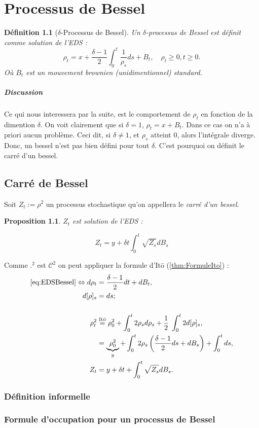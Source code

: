 \documentclass[openany]{book}
\makeatletter
\newcommand{\1}{\mathbbm{1}}
\renewenvironment{proof}[1][\textbf{\textit{Démonstration}}]{%
  \par\pushQED{\qed}%
  \normalfont\itshape\topsep6\p@\@plus6\p@\relax
  \trivlist\item[\hskip\labelsep
    #1\@addpunct{.}]\ignorespaces
}{%
  \popQED\endtrivlist\@endpefalse
}
\theoremstyle{thmfont}
\theoremstyle{deffont}
\newtheorem{definition}[definition]{Définition}
\theoremstyle{thmfont}
\newtheorem{prop}[prop]{Proposition}
\theoremstyle{deffont}
\makeatother
\begin{document}
\chapter{Processus de Bessel}

\begin{definition}[$\delta$-Processus de Bessel]
  Un $\delta$-\textit{processus de Bessel} est définit comme solution de l'EDS :
  \begin{equation}
    \rho_t = x + \dfrac{\delta-1}{2}\int_0^t \dfrac{1}{\rho_s} ds + B_t, \quad \rho_t \geq 0, t \geq 0.
    \label{eq:EDSBessel}
  \end{equation}
      Où $B_t$ est un mouvement brownien (unidimentionnel) standard.
\end{definition}
\paragraph{Discussion} Ce qui nous interessera par la suite, est le comportement de $\rho_t$ en fonction de la dimention $\delta$. On voit clairement que si $\delta = 1$, $\rho_t = x + B_t$. Dans ce cas on n'a à priori aucun problème. Ceci dit, si $\delta \neq 1$, et $\rho_s$ atteint $0$, alors l'intégrale diverge. Donc, un bessel n'est pas bien défini pour tout $\delta$. C'est pourquoi on définit le carré d'un bessel.

\section{Carré de Bessel}
Soit $Z_t := \rho^2$ un processus stochastique qu'on appellera le \textit{carré d'un bessel}.

\begin{prop}
  $Z_t$ est solution de l'EDS :

  \begin{equation}
    Z_t = y + \delta t \int_0^t \sqrt{Z_s} dB_s
    \label{eq:EDSCarreBessel}
  \end{equation}
  
\end{prop}

\begin{proof}
  Comme $.^2$ est $\mathcal C^2$ on peut appliquer la formule d'Itō (\autoref{thm:FormuleIto}) :
\begin{alignat*}{1}
  \eqref{eq:EDSBessel} \Leftrightarrow d\rho_t
  &= \dfrac{\delta -1}{2}dt + dB_t,\\
  d[\rho]_s &= ds;\\\\
  \rho_t^2 &\overset{\text{Itō}}{=} \rho_0^2 + \int_0^t 2\rho_s d\rho_s + \dfrac{1}{2}\;\int_0^t2 d[\rho]_s,\\
  &= \underbrace{\rho_0^2}_y + \int_0^t2 \rho_s \left(\dfrac{\delta -1}{2}ds + dB_s\right) +\int_0^t ds,\\
  Z_t &= y + \delta t + \int_0^t \sqrt{Z_s} dB_s.
\end{alignat*}
\end{proof}

\subsection{Définition informelle}
\subsection{Formule d'occupation pour un processus de Bessel}
\end{document}
